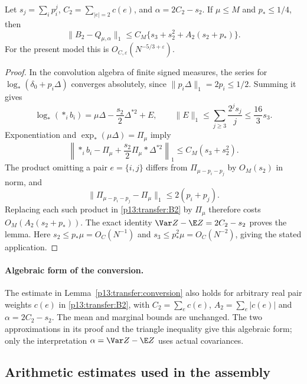 \begin{lemma}
\label{p13:transfer:conversion}
Let $s_j=\sum_i p_i^j$, $C_2=\sum_{|e|=2}c(e)$, and
$\alpha=2C_2-s_2$. If $\mu\leq M$ and $p_*\leq1/4$, then
\begin{equation}
 \|B_2-Q_{\mu,\alpha}\|_1
 \leq C_M\{s_3+s_2^2+A_2(s_2+p_*)\}.
 \label{p13:transfer:conversion-bound}
\end{equation}
For the present model this is $O_{C,\varepsilon}(N^{-5/3+\varepsilon})$.
\end{lemma}

\begin{proof}
In the convolution algebra of finite signed measures, the series for
$\log_*(\delta_0+p_i\Delta)$ converges absolutely, since
$\|p_i\Delta\|_1=2p_i\leq1/2$. Summing it gives
\[
 \log_*\left(\mathop{*}_ib_i\right)
   =\mu\Delta-\frac{s_2}{2}\Delta^{*2}+E,
 \qquad \|E\|_1\leq\sum_{j\geq3}\frac{2^js_j}{j}
                   \leq\frac{16}{3}s_3.
\]
Exponentiation and $\exp_*(\mu\Delta)=\Pi_\mu$ imply
\[
 \left\|\mathop{*}_ib_i-\Pi_\mu
              +\frac{s_2}{2}\Pi_\mu*\Delta^{*2}\right\|_1
 \leq C_M(s_3+s_2^2).
\]
The product omitting a pair $e=\{i,j\}$ differs from
$\Pi_{\mu-p_i-p_j}$ by $O_M(s_2)$ in norm, and
\[
 \|\Pi_{\mu-p_i-p_j}-\Pi_\mu\|_1\leq2(p_i+p_j).
\]
Replacing each such product in \eqref{p13:transfer:B2} by $\Pi_\mu$
therefore costs $O_M(A_2(s_2+p_*))$. The exact identity
$\Var Z-\E Z=2C_2-s_2$ proves the lemma.
Here $s_2\leq p_*\mu=O_C(N^{-1})$ and
$s_3\leq p_*^2\mu=O_C(N^{-2})$, giving the stated application.
\end{proof}

\paragraph{Algebraic form of the conversion.}
The estimate in Lemma~\ref{p13:transfer:conversion} also holds for
arbitrary real pair weights $c(e)$ in \eqref{p13:transfer:B2}, with
$C_2=\sum_e c(e)$, $A_2=\sum_e|c(e)|$ and $\alpha=2C_2-s_2$.
The mean and marginal bounds are unchanged. The two approximations
in its proof and the triangle inequality give this algebraic form;
only the interpretation $\alpha=\Var Z-\E Z$ uses actual covariances.


\subsection{Arithmetic estimates used in the assembly}

